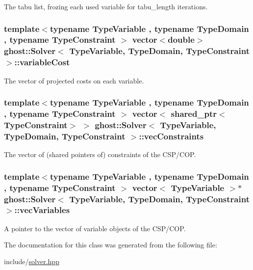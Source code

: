 The tabu list, frozing each used variable for tabu\-\_\-length iterations. 

\hypertarget{classghost_1_1Solver_a76c1057367112ead0304b436b5f508f1}{
\subsubsection[{variable\-Cost}]{\setlength{\rightskip}{0pt plus 5cm}template$<$typename Type\-Variable , typename Type\-Domain , typename Type\-Constraint $>$ vector$<$double$>$ {\bf ghost\-::\-Solver}$<$ Type\-Variable, Type\-Domain, Type\-Constraint $>$\-::variable\-Cost\hspace{0.3cm}{\ttfamily [private]}}}\label{classghost_1_1Solver_a76c1057367112ead0304b436b5f508f1}


The vector of projected costs on each variable. 

\hypertarget{classghost_1_1Solver_a170746edcfb777b12978444c2ab3962e}{
\subsubsection[{vec\-Constraints}]{\setlength{\rightskip}{0pt plus 5cm}template$<$typename Type\-Variable , typename Type\-Domain , typename Type\-Constraint $>$ vector$<$ shared\-\_\-ptr$<$Type\-Constraint$>$ $>$ {\bf ghost\-::\-Solver}$<$ Type\-Variable, Type\-Domain, Type\-Constraint $>$\-::vec\-Constraints\hspace{0.3cm}{\ttfamily [private]}}}\label{classghost_1_1Solver_a170746edcfb777b12978444c2ab3962e}


The vector of (shared pointers of) constraints of the C\-S\-P/\-C\-O\-P. 

\hypertarget{classghost_1_1Solver_a2d033a454234b2277aabdcc4d89eaba2}{
\subsubsection[{vec\-Variables}]{\setlength{\rightskip}{0pt plus 5cm}template$<$typename Type\-Variable , typename Type\-Domain , typename Type\-Constraint $>$ vector$<$ Type\-Variable $>$$\ast$ {\bf ghost\-::\-Solver}$<$ Type\-Variable, Type\-Domain, Type\-Constraint $>$\-::vec\-Variables\hspace{0.3cm}{\ttfamily [private]}}}\label{classghost_1_1Solver_a2d033a454234b2277aabdcc4d89eaba2}


A pointer to the vector of variable objects of the C\-S\-P/\-C\-O\-P. 



The documentation for this class was generated from the following file\-:\begin{DoxyCompactItemize}
\item 
include/\hyperlink{solver_8hpp}{solver.\-hpp}\end{DoxyCompactItemize}
